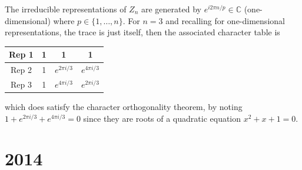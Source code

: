 \documentclass[a4paper]{article}
\begin{document}
\begin{ans}
\begin{enumerate}[label=(\roman*)]
\begin{enumerate}[label=(\alph*)]
The irreducible representations of $Z_n$ are generated by $e^{i2\pi n/p}\in\mathbb{C}$ (one-dimensional) where $p\in\{1,\dots,n\}$. For $n=3$ and recalling for one-dimensional representations, the trace is just itself, then the associated character table is
\begin{center}
\begin{tabular}{ |c|c|c|c| } 
\hline
   Rep 1 & 1 &1 &1\\
   \hline
   Rep 2 & 1 &$e^{2\pi i/3}$ & $e^{4\pi i/3}$\\
   \hline
   Rep 3 & 1 & $e^{4\pi i/3}$ & $e^{2\pi i/3}$\\
 \hline
\end{tabular}
\end{center}
which does satisfy the character orthogonality theorem, by noting $1+e^{2\pi i/3}+e^{4\pi i/3}=0$ since they are roots of a quadratic equation $x^2+x+1=0$.
\end{enumerate}
\end{enumerate}
\end{ans}
\newpage
\section{2014}
\end{document}
